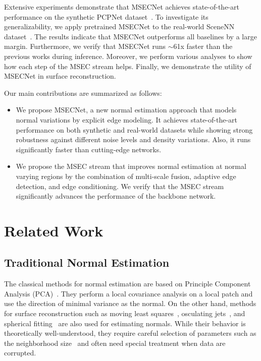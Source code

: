\documentclass[sigconf]{acmart}
\begin{document}
Extensive experiments demonstrate that MSECNet achieves state-of-the-art performance on the synthetic PCPNet dataset~\cite{guerrero2018pcpnet}. To investigate its generalizability, we apply pretrained MSECNet to the real-world SceneNN dataset~\cite{hua2016scenenn}. The results indicate that MSECNet outperforms all baselines by a large margin. 
Furthermore, we verify that MSECNet runs $\sim$61x faster than the previous works during inference. Moreover, we perform various analyses to show how each step of the MSEC stream helps. Finally, we demonstrate the utility of MSECNet in surface reconstruction.  

Our main contributions are summarized as follows:
\begin{itemize}
    \item We propose MSECNet, a new normal estimation approach that models normal variations by explicit edge modeling. 
It achieves state-of-the-art performance on both synthetic and real-world datasets while showing strong robustness against different noise levels and density variations. Also, it runs significantly faster than cutting-edge networks.      
    \item We propose the MSEC stream that improves normal estimation at normal varying regions by the combination of multi-scale fusion, adaptive edge detection, and edge conditioning. We verify that the MSEC stream significantly advances the performance of the backbone network. 
\end{itemize}



\section{Related Work}

\subsection{Traditional Normal Estimation}
The classical methods for normal estimation are based on Principle Component Analysis (PCA)~\cite{hoppe1992surface,dey2006normal,alliez2007voronoi}. They perform a local covariance analysis on a local patch and use the direction of minimal variance as the normal. 
On the other hand, methods for surface reconstruction such as moving least squares~\cite{lancaster1981surfaces,alexa2001point}, osculating jets~\cite{cazals2005estimating},
and spherical fitting~\cite{guennebaud2007algebraic}
are also used for estimating normals. 
While their behavior is theoretically well-understood, they require careful selection of parameters such as the neighborhood size~\cite{mitra2003estimating} and often need special treatment when data are corrupted.
\end{document}
